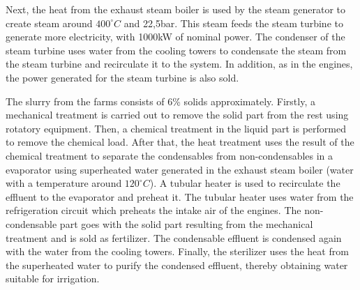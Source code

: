 Next, the heat from the exhaust steam boiler is used by the steam generator to create steam around $400^{\circ}C$ and 22,5bar. This steam feeds the steam turbine to generate more electricity, with 1000kW of nominal power. The condenser of the steam turbine uses water from the cooling towers to condensate the steam from the steam turbine and recirculate it to the system. In addition, as in the engines, the power generated for the steam turbine is also sold. 

The slurry from the farms consists of 6\% solids approximately. Firstly, a mechanical treatment is carried out to remove the solid part from the rest using rotatory equipment. Then, a chemical treatment in the liquid part is performed to remove the chemical load. After that, the heat treatment uses the result of the chemical treatment to separate the condensables from non-condensables in a evaporator using superheated water generated in the exhaust steam boiler (water with a temperature around $120^{\circ}C$). A tubular heater is used to recirculate the effluent to the evaporator and preheat it. The tubular heater uses water from the refrigeration circuit which preheats the intake air of the engines. The non-condensable part goes with the solid part resulting from the mechanical treatment and is sold as fertilizer. The condensable effluent is condensed again with the water from the cooling towers. Finally, the sterilizer uses the heat from the superheated water to purify the condensed effluent, thereby obtaining water suitable for irrigation. 